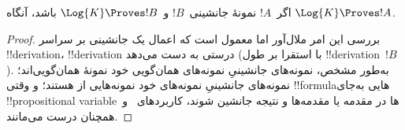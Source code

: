 \documentclass[../../../include/open-logic-section]{subfiles}
\begin{document}
\begin{prop}
  اگر~$!A$ نمونهٔ جانشینی~$!B$ و~$\Log{K} \Proves !B$ باشد، آنگاه
  $\Log{K} \Proves !A$.
\end{prop}

\begin{proof}
  بررسی این امر ملال‌آور اما معمول است که اعمال یک جانشینی بر سراسر
  !!{derivation}، !!{derivation} درستی به دست می‌دهد (با استقرا بر طول
  !!{derivation}~$!B$). به‌طور مشخص، نمونه‌های جانشینیِ نمونه‌های
  همان‌گویی خود نمونهٔ همان‌گویی‌اند؛ نمونه‌های جانشینیِ نمونه‌های
   خود نمونه‌هایی از
   هستند؛ و وقتی !!{formula}هایی
  به‌جای !!{propositional variable}ها در مقدمه‌ یا مقدمه‌ها و نتیجه
  جانشین شوند، کاربردهای~\MP{} و~\Nec{} همچنان درست می‌مانند.
\end{proof}
\end{document}
